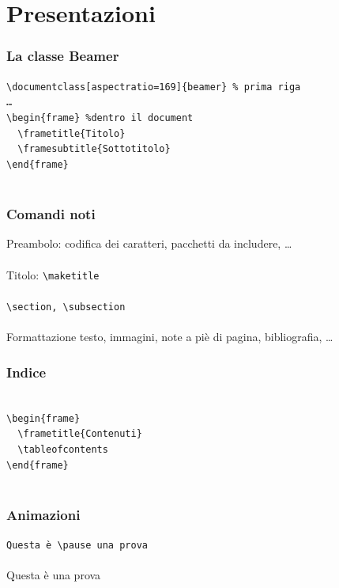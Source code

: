 \documentclass[aspectratio=169,compress]{beamer}
\newcommand{\1}{\ensuremath{\mathds{1}}}
\begin{document}
\section{Presentazioni}
\begin{frame}\centering
  \frametitle{La classe Beamer}
  \texttt{\textbackslash{}documentclass[aspectratio=169]\{beamer\} \% prima riga} 
  \pause
  \texttt{\\\dots\\
  \textbackslash{}begin\{frame\} \%dentro il document
\\
  ~~\textbackslash{}frametitle\{Titolo\}~~~~~~~~~~~~~
\\
  ~~\textbackslash{}framesubtitle\{Sottotitolo\}~~~~~
\\
  \textbackslash{}end\{frame\}
~~~~~~~~~~~~~~~~~~~~~~~\\~}
\end{frame}
\begin{frame}\centering
  \frametitle{Comandi noti}
  Preambolo: codifica dei caratteri, pacchetti da includere, \dots\\~\\\pause
  Titolo: \texttt{\textbackslash{}maketitle}\\~\\\pause
  \texttt{\textbackslash{}section, \textbackslash{}subsection}\\~\\\pause
  Formattazione testo, immagini, note a piè di pagina, bibliografia, \dots
\end{frame}
\begin{frame}\centering
  \frametitle{Indice}
  \texttt{~\\
  \textbackslash{}begin\{frame\}~~~~~~~~~~~\\
  ~~\textbackslash{}frametitle\{Contenuti\}\\
  ~~\textbackslash{}tableofcontents~~~~~~~~\\
  \textbackslash{}end\{frame\}~~~~~~~~~~~~~\\~
}
\end{frame}
\begin{frame}\centering
  \frametitle{Animazioni}
  \texttt{Questa è \textbackslash{}pause una prova}\\~\\\pause
  Questa è \pause una prova
\end{frame}
\end{document}
